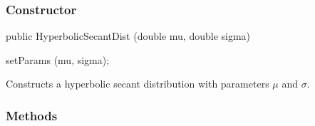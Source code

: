 \subsubsection* {Constructor}

\begin{code}

   public HyperbolicSecantDist (double mu, double sigma)\begin{hide} {
      setParams (mu, sigma);
   }\end{hide}
\end{code}
\begin{tabb}
   Constructs a hyperbolic secant distribution with parameters
   $\mu$ and $\sigma$.
\end{tabb}

\subsubsection* {Methods}

